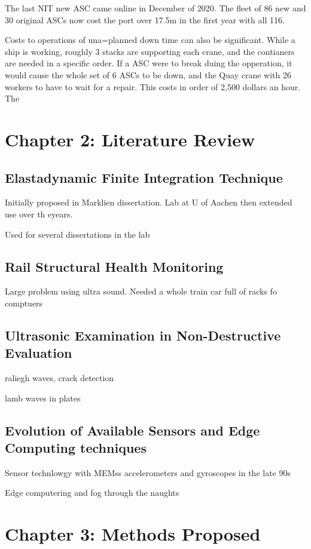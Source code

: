 \documentclass[journal=jacsat,manuscript=article]{achemso}
\begin{document}
The last NIT new ASC came online in December of 2020.  The fleet of 86 new and 30 original ASCs now cost the port over 17.5m in the first year with all 116. 

Costs to operations of una=planned down time can also be significant.  While a ship is working, roughly 3 stacks are supporting each crane, and the contianers are needed in a specific order.  If a ASC were to break duing the opperation, it would cause the whole set of 6 ASCs to be down, and the Quay crane with 26 workers to have to wait for a repair.  This costs in order of 2,500 dollars an hour.  The 

\pagebreak
\section{Chapter 2: Literature Review}
\subsection{Elastadynamic Finite Integration Technique}
Initially proposed in Marklien dissertation.  Lab at U of Aachen then extended use over th eyears.

Used for several dissertations in the lab

\subsection{Rail Structural Health Monitoring}
Large problem using ultra sound.  Needed a whole train car full of racks fo comptuers

\subsection{Ultrasonic Examination in Non-Destructive Evaluation}
raliegh waves, crack detection

lamb waves in plates

\subsection{Evolution of Available Sensors and Edge Computing techniques}
Sensor technlowgy with MEMss accelerometers and gyroscopes in the late 90s

Edge computering and fog through the naughts


\pagebreak
\section{Chapter 3: Methods Proposed}
\end{document}
